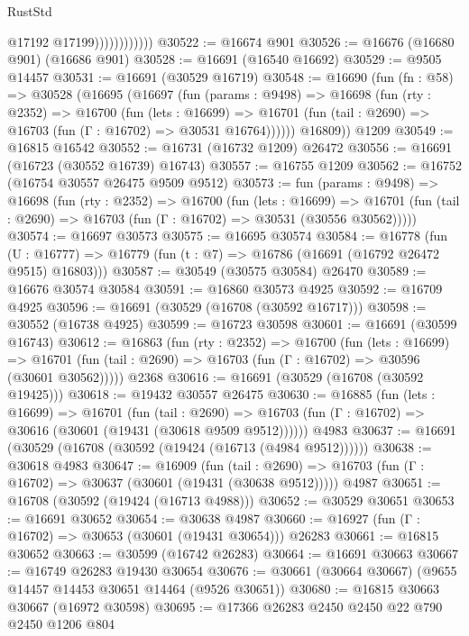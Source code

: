\begin{lexlean}{RustStd}
\begin{coremodule}
                            @17192
                            @17199))))))))))))
@30522 := @16674 @901
@30526 := @16676 (@16680 @901) (@16686 @901)
@30528 := @16691 (@16540 @16692)
@30529 := @9505 @14457
@30531 := @16691 (@30529 @16719)
@30548 := @16690
    (fun (fn : @58) =>
    @30528
      (@16695
        (@16697
          (fun (params : @9498) =>
          @16698
            (fun (rty : @2352) =>
            @16700
              (fun (lets : @16699) =>
              @16701 (fun (tail : @2690) => @16703 (fun (Γ : @16702) => @30531 @16764))))))
        @16809))
    @1209
@30549 := @16815 @16542
@30552 := @16731 (@16732 @1209) @26472
@30556 := @16691 (@16723 (@30552 @16739) @16743)
@30557 := @16755 @1209
@30562 := @16752 (@16754 @30557 @26475 @9509 @9512)
@30573 := fun (params : @9498) =>
  @16698
    (fun (rty : @2352) =>
    @16700
      (fun (lets : @16699) =>
      @16701 (fun (tail : @2690) => @16703 (fun (Γ : @16702) => @30531 (@30556 @30562)))))
@30574 := @16697 @30573
@30575 := @16695 @30574
@30584 := @16778
    (fun (U : @16777) => @16779 (fun (t : @7) => @16786 (@16691 (@16792 @26472 @9515) @16803)))
@30587 := @30549 (@30575 @30584) @26470
@30589 := @16676 @30574 @30584
@30591 := @16860 @30573 @4925
@30592 := @16709 @4925
@30596 := @16691 (@30529 (@16708 (@30592 @16717)))
@30598 := @30552 (@16738 @4925)
@30599 := @16723 @30598
@30601 := @16691 (@30599 @16743)
@30612 := @16863
    (fun (rty : @2352) =>
    @16700
      (fun (lets : @16699) =>
      @16701 (fun (tail : @2690) => @16703 (fun (Γ : @16702) => @30596 (@30601 @30562)))))
    @2368
@30616 := @16691 (@30529 (@16708 (@30592 @19425)))
@30618 := @19432 @30557 @26475
@30630 := @16885
    (fun (lets : @16699) =>
    @16701
      (fun (tail : @2690) =>
      @16703 (fun (Γ : @16702) => @30616 (@30601 (@19431 (@30618 @9509 @9512))))))
    @4983
@30637 := @16691 (@30529 (@16708 (@30592 (@19424 (@16713 (@4984 @9512))))))
@30638 := @30618 @4983
@30647 := @16909
    (fun (tail : @2690) => @16703 (fun (Γ : @16702) => @30637 (@30601 (@19431 (@30638 @9512)))))
    @4987
@30651 := @16708 (@30592 (@19424 (@16713 @4988)))
@30652 := @30529 @30651
@30653 := @16691 @30652
@30654 := @30638 @4987
@30660 := @16927 (fun (Γ : @16702) => @30653 (@30601 (@19431 @30654))) @26283
@30661 := @16815 @30652
@30663 := @30599 (@16742 @26283)
@30664 := @16691 @30663
@30667 := @16749 @26283 @19430 @30654
@30676 := @30661 (@30664 @30667) (@9655 @14457 @14453 @30651 @14464 (@9526 @30651))
@30680 := @16815 @30663 @30667 (@16972 @30598)
@30695 := @17366
    @26283
    @2450
    @2450
    @22
    @790
    @2450
    @1206
    @804

\end{coremodule}
\end{lexlean}
